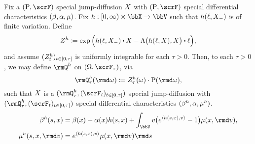 \begin{theorem}
  \label{theorem:LK-girsanov}
  Fix a $(\Prb, \scrF)$ special jump-diffusion $X$ with $(\Prb, \scrF)$ special differential characteristics $(\beta, \alpha, \mu)$.
  Fix $\twistFunc: [0,\infty) \times \stateSpace \rightarrow \vecSpace$ such that $h(\ell, X_-)$ is of finite variation.
  Define
  \[
    \mgDensity^\twistFunc \defeq \exp\Big(\twistFunc(\leb, \X_-) \shortInt \X - \ode\big(\twistFunc(\leb, \X), \X\big) \shortInt \leb\Big),
  \]
  and assume $(Z^h_t)_{t\in[0,\tau]}$ is uniformly integrable for each $\tau > 0$.
  Then, to each $\tau > 0$, we may define $\mgPrb^\twistFunc$ on $(\Omega, \scrF_\tau)$, via
  \[
    \mgPrb^\twistFunc_\tau(\rmd\omega) \defeq \mgDensity^\twistFunc_\tau(\omega) \cdot \Prb(\rmd\omega),
  \]
  such that $X$ is a $(\mgPrb^\twistFunc_\tau, (\scrF_t)_{t\in[0,\tau]})$ special jump-diffusion with $(\mgPrb^\twistFunc_\tau, (\scrF_t)_{t\in[0,\tau]})$ special differential characteristics $(\beta^h, \alpha, \mu^h)$.
  \begin{align*}
    \affDrift^\twistFunc(s, \stateVar) &= \affDrift(\stateVar) + \affDiff(\stateVar) \twistFunc(s, \stateVar) + \int_\vecSpace \markVar \big( e^\prj{\twistFunc(s,\stateVar)}{\markVar} - 1 \big) \affJump(\stateVar, \rmd\markVar), \\
    \affJump^\twistFunc(s, \stateVar, \rmd\markVar) &= e^\prj{\twistFunc(s,\stateVar)}{\markVar} \affJump(\stateVar, \rmd\markVar) \rmd s
  \end{align*}
\end{theorem}
